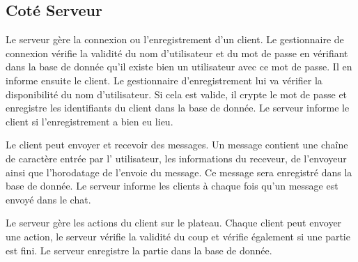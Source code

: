 \subsection{Coté Serveur}


Le serveur gère la connexion ou l'enregistrement d'un client. 
Le gestionnaire de connexion vérifie la validité du nom d'utilisateur et
du mot de passe en vérifiant dans la base de donnée qu'il existe bien un utilisateur avec ce mot de passe. Il en informe ensuite le client.
Le gestionnaire d'enregistrement lui va vérifier la disponibilité du nom d'utilisateur. Si cela est valide, il crypte le mot de passe et enregistre les identifiants du client dans la base de donnée. Le serveur informe le client si l'enregistrement a bien eu lieu.

Le client peut envoyer et recevoir des messages.
Un message contient une chaîne de caractère entrée par l' utilisateur, les informations du receveur, de l'envoyeur ainsi que l'horodatage de l'envoie du message. Ce message sera enregistré dans la base de donnée. Le serveur informe les clients à chaque fois qu'un message est envoyé dans le chat.

Le serveur gère les actions du client sur le plateau.
Chaque client peut envoyer une action, le serveur vérifie la validité du coup et vérifie également si une partie est fini. Le serveur enregistre la partie dans la base de donnée.

